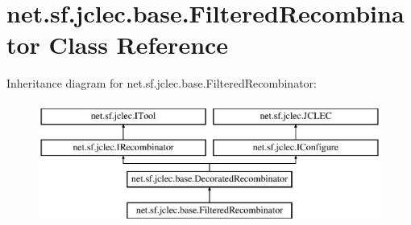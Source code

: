 \hypertarget{classnet_1_1sf_1_1jclec_1_1base_1_1_filtered_recombinator}{\section{net.\-sf.\-jclec.\-base.\-Filtered\-Recombinator Class Reference}
\label{classnet_1_1sf_1_1jclec_1_1base_1_1_filtered_recombinator}
}
Inheritance diagram for net.\-sf.\-jclec.\-base.\-Filtered\-Recombinator\-:\begin{figure}[H]
\begin{center}
\leavevmode
\includegraphics[height=4.000000cm]{classnet_1_1sf_1_1jclec_1_1base_1_1_filtered_recombinator}
\end{center}
\end{figure}
